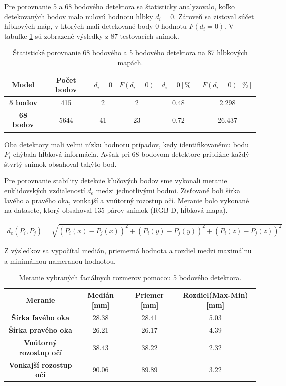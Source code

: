Pre porovnanie 5 a 68 bodového detektora sa štatisticky analyzovalo, koľko detekovaných bodov malo nulovú hodnotu hĺbky $d_i=0$. Zároveň sa zisťoval súčet hĺbkových máp, v ktorých mali detekované body 0 hodnotu $F(d_i=0)$. V tabuľke \ref{tab:dlib:compare} sú zobrazené výsledky z 87 testovacích snímok.  

\begin{table}[h]
	\caption{\label{tab:dlib:compare} Štatistické porovnanie 68 bodového a 5 bodového detektora na 87 hĺbkových mapách.}
	\centering
	\begin{tabular}{cccccc}
		\toprule
		\textbf{Model} & \textbf{Počet bodov} & \textbf{$d_i=0$} & \textbf{$F(d_i=0)$} & \textbf{$d_i=0 [\%]$ } & \textbf{$F(d_i=0) [\%]$} \\ 
		\midrule
		\textbf{5 bodov} 	& 415 	& 2		& 2		& 0.48	& 2.298 \\
		\textbf{68 bodov} 	& 5644	& 41 	& 23	& 0.72	& 26.437 \\
		\bottomrule
	\end{tabular}
\end{table}

Oba detektory mali veľmi nízku hodnotu prípadov, kedy identifikovanému bodu $P_i$ chýbala hĺbková informácia. Avšak pri 68 bodovom detektore približne každý štvrtý snímok obsahoval takýto bod. 


Pre porovnanie stability detekcie kľučových bodov sme vykonali meranie euklidovských vzdialeností $d_e$ medzi jednotlivými bodmi. Zisťované boli šírka ľavého a pravého oka, vonkajší a vnútorný rozostup očí. Meranie bolo vykonané na datasete, ktorý obsahoval 135 párov snímok (RGB-D, hĺbková mapa).

\begin{equation}
\label{eq:euclidean}
\begin{aligned}
d_{e}\left(P_i,P_j\right)= \sqrt{\left(P_i(x) - P_j(x)\right)^2 + \left(P_i(y) - P_j(y)\right)^2 + \left(P_i(z) - P_j(z)\right)^2} 
\end{aligned}
\end{equation}

Z výsledkov sa vypočítal medián, priemerná hodnota a rozdiel medzi maximálnu a minimálnou nameranou hodnotou. 
 
\begin{table}[h]
	\caption{\label{tab:dlib:5points} Meranie vybraných faciálnych rozmerov pomocou 5 bodového detektora.}
	\centering
	\begin{tabular}{cccc}
		\toprule
		\textbf{Meranie} & \textbf{Medián [mm]} & \textbf{Priemer [mm]} & \textbf{Rozdiel(Max-Min) [mm]} \\ 
		\midrule
		\textbf{Šírka ľavého oka} 	& 28.38 & 28.41	& 5.03 \\
		\textbf{Šírka pravého oka} 	& 26.21	& 26.17 & 4.39 \\
		\textbf{Vnútorný rozostup očí} 	& 38.43	& 38.22 & 2.32 \\
		\textbf{Vonkajší rozostup očí} 	& 90.06	& 89.89 & 3.22 \\
		\bottomrule
	\end{tabular}
\end{table}

